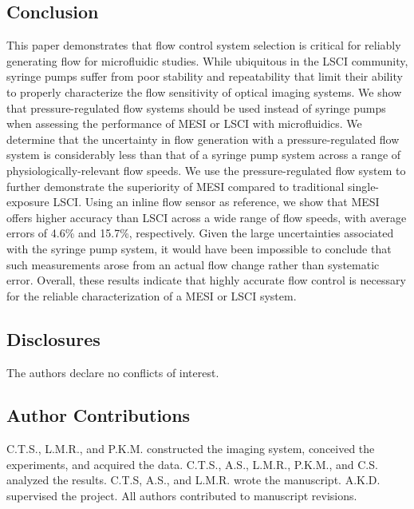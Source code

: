 \documentclass[12pt]{spieman}
\begin{document}
\begin{spacing}{2}
\section{Conclusion}
\label{sect:conclusion}

This paper demonstrates that flow control system selection is critical for reliably generating flow for microfluidic studies. While ubiquitous in the LSCI community, syringe pumps suffer from poor stability and repeatability that limit their ability to properly characterize the flow sensitivity of optical imaging systems. We show that pressure-regulated flow systems should be used instead of syringe pumps when assessing the performance of MESI or LSCI with microfluidics. We determine that the uncertainty in flow generation with a pressure-regulated flow system is considerably less than that of a syringe pump system across a range of physiologically-relevant flow speeds. We use the pressure-regulated flow system to further demonstrate the superiority of MESI compared to traditional single-exposure LSCI. Using an inline flow sensor as reference, we show that MESI offers higher accuracy than LSCI across a wide range of flow speeds, with average errors of 4.6\% and 15.7\%, respectively. Given the large uncertainties associated with the syringe pump system, it would have been impossible to conclude that such measurements arose from an actual flow change rather than systematic error. Overall, these results indicate that highly accurate flow control is necessary for the reliable characterization of a MESI or LSCI system.


\subsection*{Disclosures}
The authors declare no conflicts of interest.

\subsection*{Author Contributions}
C.T.S., L.M.R., and P.K.M. constructed the imaging system, conceived the experiments, and acquired the data. C.T.S., A.S., L.M.R., P.K.M., and C.S. analyzed the results. C.T.S, A.S., and L.M.R. wrote the manuscript. A.K.D. supervised the project. All authors contributed to manuscript revisions.


\end{spacing}
\end{document}
